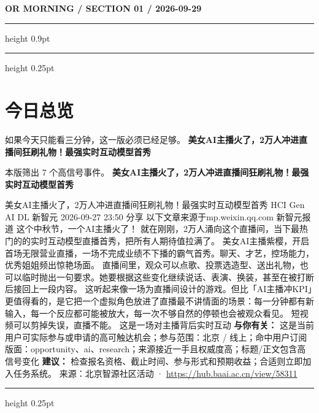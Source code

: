 \documentclass[10.5pt]{ctexart}
\begin{document}
{\small\bfseries OR MORNING / SECTION 01 / 2026-09-29}
\vspace{2mm}
\hrule height 0.9pt
\vspace{1.5mm}
\hrule height 0.25pt
\vspace{4mm}
\section*{今日总览}
{\color{ormuted} 如果今天只能看三分钟，这一版必须已经足够。}
\vspace{2mm}
{\fontsize{25}{29}\selectfont\bfseries 美女AI主播火了，2万人冲进直播间狂刷礼物！最强实时互动模型首秀}\par
\vspace{2mm}
{\large 本版筛出 7 个高信号事件。}
\vspace{3mm}
{\Large\bfseries 美女AI主播火了，2万人冲进直播间狂刷礼物！最强实时互动模型首秀}\par
美女AI主播火了，2万人冲进直播间狂刷礼物！最强实时互动模型首秀 HCI Gen AI DL 新智元 2026-09-27 23:50 分享 以下文章来源于mp.weixin.qq.com 新智元报道 这个中秋节，一个AI主播火了！ 就在刚刚，2万人涌向这个直播间，当下最热门的的实时互动模型直播首秀，把所有人期待值拉满了。 美女AI主播紫樱，开启首场无限营业直播，一场不完成业绩不下播的霸气首秀。聊天、才艺，控场能力，优秀姐姐频出惊艳场面。 直播间里，观众可以点歌、投票选造型、送出礼物，也可以临时抛出一句要求。她要根据这些变化继续说话、表演、换装，甚至在被打断后接回上一段内容。 这听起来像一场为直播间设计的游戏。但比「AI主播冲KPI」更值得看的，是它把一个虚拟角色放进了直播最不讲情面的场景：每一分钟都有新输入，每一个反应都可能被放大，每一次不够自然的停顿也会被观众看见。 短视频可以剪掉失误，直播不能。 这是一场对主播背后实时互动
\textbf{与你有关：} 这是当前用户可实际参与或申请的高可触达机会；参与范围：北京 / 线上；命中用户订阅版面：opportunity、ai、research；来源接近一手且权威度高；标题/正文包含高信号变化
\textbf{建议：} 检查报名资格、截止时间、参与形式和预期收益；合适则立即加入任务系统。
{\footnotesize\color{ormuted} 来源：北京智源社区活动 · \url{https://hub.baai.ac.cn/view/58311}}
\vspace{3mm}
\hrule height 0.25pt
\vspace{3mm}
\end{document}
